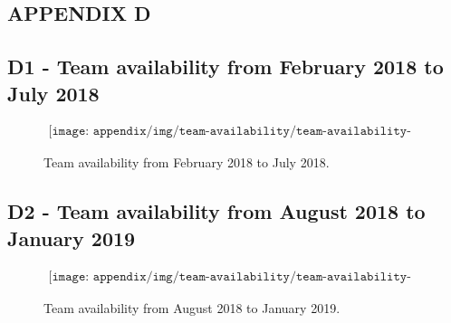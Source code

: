 \begin{landscape}
\section{APPENDIX D} \label{sec:appD}

\subsection*{D1 - Team availability from February 2018 to July 2018}

\begin{figure}[H]
    \begin{align*}
        \texttt{[image: appendix/img/team-availability/team-availability-feb18-jul18.png]}
    \end{align*}
    \caption{Team availability from February 2018 to July 2018.}
    \label{fig:team-availability-feb18-jul18}
\end{figure}

\end{landscape}

\pagebreak

\begin{landscape}

\subsection*{D2 - Team availability from August 2018 to January 2019}

\begin{figure}[H]
    \begin{align*}
        \texttt{[image: appendix/img/team-availability/team-availability-aug18-jan19.png]}
    \end{align*}
    \caption{Team availability from August 2018 to January 2019.}
    \label{fig:team-availability-aug18-jan19}
\end{figure}

\end{landscape}